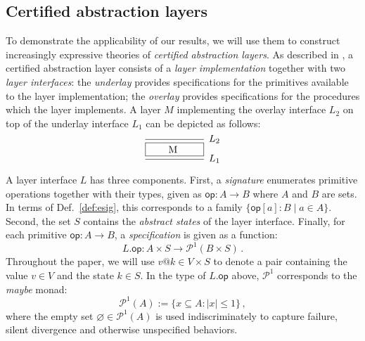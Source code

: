\documentclass[sigplan,screen]{acmart}
\newcommand{\kw}[1]{\ensuremath{ \mathsf{#1} }}
\begin{document}


\subsection{Certified abstraction layers} %

To demonstrate the applicability of our results,
we will use them to construct
increasingly expressive theories of
\emph{certified abstraction layers}.
As described in \citet{popl15},
a certified abstraction layer
consists of a \emph{layer implementation} together with
two \emph{layer interfaces}:
the \emph{underlay} provides specifications for
the primitives available to the layer implementation;
the \emph{overlay} provides specifications for
the procedures which the layer implements.
A layer $M$ implementing the overlay interface $L_2$
on top of the underlay interface $L_1$ can be depicted as follows:
\[
  \begin{prooftree}
    \infer0[$L_2$]{\fbox{\qquad M \qquad}}
    \infer1[$L_1$]{}
  \end{prooftree}
\]

A layer interface $L$ has three components.
First, a \emph{signature} enumerates
primitive operations together with their types,
given as $\kw{op} : A \rightarrow B$
where $A$ and $B$ are sets.
In terms of Def.~\ref{def:esig},
this corresponds to a family $\{ \kw{op}[a] : B \mid a \in A \}$.
Second,
the set $S$ contains the \emph{abstract states} of the layer interface.
Finally, for each primitive
$\kw{op} : A \rightarrow B$,
a \emph{specification}
is given as a function:
\[
  L.\kw{op} : A \times S \rightarrow \mathcal{P}^1(B \times S) \,.
\]
Throughout the paper,
we will use $v@k \in V \times S$ to denote a pair
containing the value $v \in V$ and the state $k \in S$.
In the type of $L.\kw{op}$ above,
$\mathcal{P}^1$ corresponds to the \emph{maybe} monad:
\[
  \mathcal{P}^1(A) := \{ x \subseteq A : |x| \le 1 \} \,,
\]
where the empty set $\varnothing \in \mathcal{P}^1(A)$
is used indiscriminately to capture
failure, silent divergence and otherwise unspecified behaviors.
\end{document}
